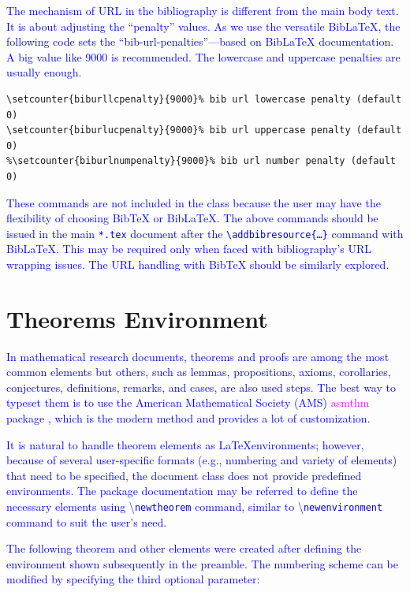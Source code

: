 \documentclass[phd]{ndsu-thesis-2022}
\newcommand\italk[1]{\textcolor{blue}{#1}}  %
\newcommand\cmd[1]{\textbackslash\texttt{#1}}  %
\newcommand\tb{\textbackslash}
\begin{document}
\italk{The mechanism of URL in the bibliography is different from the main body text. It is about adjusting the ``penalty'' values. As we use the versatile BibLaTeX, the following code sets the ``bib-url-penalties''---based on BibLaTeX documentation. A big value like 9000 is recommended. The lowercase and uppercase penalties are usually enough.} 

\vspace{-2ex}
\begin{verbatim}
\setcounter{biburllcpenalty}{9000}% bib url lowercase penalty (default 0)
\setcounter{biburlucpenalty}{9000}% bib url uppercase penalty (default 0)
%\setcounter{biburlnumpenalty}{9000}% bib url number penalty (default 0)
\end{verbatim}
\vspace{-2ex}

\italk{These commands are not included in the class because the user may have the flexibility of choosing BibTeX or BibLaTeX. The above commands should be issued in the main \texttt{*.tex} document after the \texttt{\tb addbibresource\{\ldots\}} command with BibLaTeX. This may be required only when faced with bibliography's URL wrapping issues. The URL handling with BibTeX should be similarly explored. }

\section{Theorems Environment}

\italk{In mathematical research documents, theorems and proofs are among the most common elements but others, such as lemmas, propositions, axioms, corollaries, conjectures, definitions, remarks, and cases, are also used steps. The best way to typeset them is to use the American Mathematical Society (AMS) \textcolor{magenta}{asmthm} package \citep{amsthm2017}, which is the modern method and provides a lot of customization.} 

\italk{It is natural to handle theorem elements as \LaTeX environments; however, because of several user-specific formats (e.g., numbering and variety of elements) that need to be specified, the document class does not provide predefined environments. The package documentation may be referred to define the necessary elements using \cmd{newtheorem} command, similar to \cmd{newenvironment} command to suit the user's need.} 

\italk{The following theorem and other elements were created after defining the environment shown subsequently in the preamble. The numbering scheme can be modified by specifying the third optional parameter:}
\end{document}
